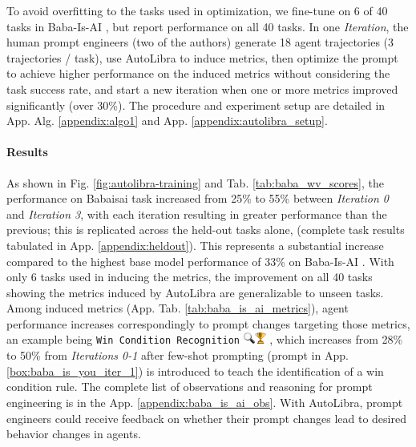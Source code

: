 

To avoid overfitting to the tasks used in optimization, we fine-tune on 6 of 40 tasks
in Baba-Is-AI \citep{paglieri2024balrog}, but report performance on all 40 tasks.
In one \textit{Iteration}, the human prompt engineers (two of the authors)
generate 18 agent trajectories (3 trajectories / task), use AutoLibra to induce metrics,
then optimize the prompt to achieve higher performance on the induced metrics
without considering the task success rate, and start a new iteration when one or
more metrics improved significantly (over 30\%). The procedure and experiment setup
are detailed in App. Alg. \ref{appendix:algo1} and App.
\ref{appendix:autolibra_setup}.
\vspace{-0.4cm}

\paragraph{Results}
As shown in Fig. \ref{fig:autolibra-training} and Tab. \ref{tab:baba_wv_scores},
the performance on Babaisai task increased from 25\% to 55\% between \textit{Iteration
0} and \textit{Iteration 3}, with each iteration resulting in greater performance
than the previous; this is replicated across the held-out tasks alone, (complete
task results tabulated in App. \ref{appendix:heldout}). This represents a substantial
increase compared to the highest base model performance of 33\% on Baba-Is-AI
\citep{paglieri2024balrog}. With only 6 tasks used in inducing the metrics, the improvement
on all 40 tasks showing the metrics induced by AutoLibra are generalizable to unseen
tasks. Among induced metrics (App. Tab. \ref{tab:baba_is_ai_metrics}), agent performance
increases correspondingly to prompt changes targeting those metrics, an example
being \texttt{Win Condition Recognition}
\includegraphics[height=1em]{figs/emojis/emoji_1.png}
, which increases from 28\% to 50\% from \textit{Iterations 0-1} after few-shot
prompting (prompt in App. \ref{box:baba_is_you_iter_1}) is introduced to teach the
identification of a win condition rule. The complete list of observations and
reasoning for prompt engineering is in the App. \ref{appendix:baba_is_ai_obs}.
With AutoLibra, prompt engineers could receive feedback on whether their prompt changes
lead to desired behavior changes in agents.

